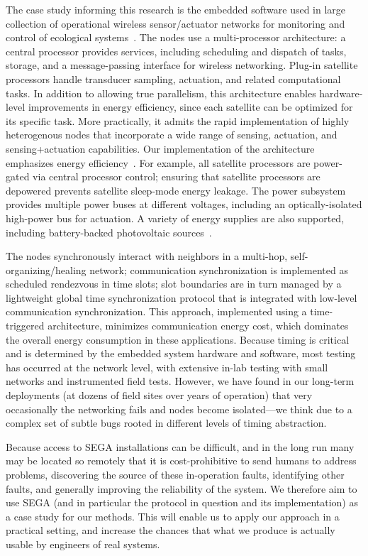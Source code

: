 The case study informing this research is the embedded software used in large collection of operational wireless sensor/actuator networks for monitoring and control of ecological systems~\cite{ClaEtAl11,GhoEtAl2014,BelEtAl2015}. The nodes use a multi-processor architecture: a central processor provides services, including scheduling and dispatch of tasks, storage, and a message-passing interface for wireless networking. Plug-in satellite processors handle transducer sampling, actuation, and related computational tasks. In addition to allowing true parallelism, this architecture enables hardware-level improvements in energy efficiency, since each satellite can be optimized for its specific task. More practically, it admits the rapid implementation of highly heterogenous nodes that incorporate a wide range of sensing, actuation, and sensing+actuation
capabilities. Our implementation of the architecture emphasizes energy efficiency~\cite{FliSENSORS2010,FliICC2011}.  For example, all satellite processors are power-gated via central processor control; ensuring that satellite processors are depowered prevents satellite sleep-mode energy leakage. The power subsystem provides multiple power buses at different voltages, including an optically-isolated high-power bus for actuation.  A variety of energy supplies are also supported, including battery-backed photovoltaic sources~\cite{FliEtAl12,KnaFli17}.

The nodes synchronously interact with neighbors in a multi-hop, self-organizing/healing network; communication synchronization is implemented as scheduled rendezvous in time slots; slot boundaries are in turn managed by a lightweight global time synchronization protocol that is integrated with low-level communication synchronization.  This approach, implemented using a time-triggered architecture, minimizes communication energy cost, which dominates the overall energy consumption in these applications. Because timing is critical and is determined by the embedded system hardware and software, most testing has occurred at the network level, with extensive in-lab testing with small networks and instrumented field tests.  However, we have found in our long-term deployments (at dozens of field sites over years of operation) that very occasionally the networking fails and nodes become isolated---we think due to a complex set of subtle bugs rooted in different levels of timing abstraction.  

Because access to SEGA installations can be difficult, and in the long run many may be located so remotely that it is cost-prohibitive to send humans to address problems, discovering the source of these in-operation faults, identifying other faults, and generally improving the reliability of the system.  We therefore aim to use SEGA (and in particular the protocol in question and its implementation) as a case study for our methods.  This will enable us to apply our approach in a practical setting, and increase the chances that what we produce is actually usable by engineers of real systems.

